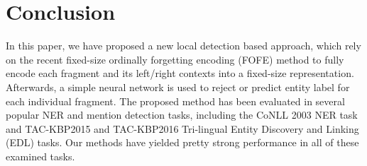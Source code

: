 \documentclass[11pt,a4paper]{article}
\begin{document}

\section{Conclusion}

In this paper, we have proposed a new local detection based approach, which rely on the recent fixed-size ordinally forgetting encoding (FOFE) method to fully encode each fragment and its left/right contexts into a fixed-size representation. Afterwards, a simple neural network is used to reject or predict entity label for each individual fragment. The proposed method has been evaluated in several popular NER and mention detection tasks, including the CoNLL 2003 NER task and  TAC-KBP2015 and TAC-KBP2016 Tri-lingual Entity Discovery and Linking (EDL) tasks. Our methods have yielded pretty strong performance in all of these examined tasks. 




	
	
\end{document}
